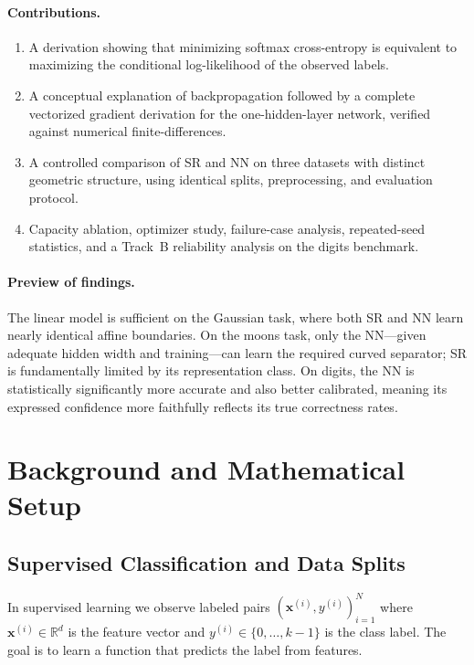 \documentclass[11pt]{article}
\newcommand{\R}{\mathbb{R}}
\newcommand{\vx}{\mathbf{x}}
\begin{document}
\paragraph{Contributions.}
\begin{enumerate}[leftmargin=*, itemsep=0.2em]
    \item A derivation showing that minimizing softmax cross-entropy is equivalent to
          maximizing the conditional log-likelihood of the observed labels.
    \item A conceptual explanation of backpropagation followed by a complete vectorized
          gradient derivation for the one-hidden-layer network, verified against
          numerical finite-differences.
    \item A controlled comparison of SR and NN on three datasets with distinct geometric
          structure, using identical splits, preprocessing, and evaluation protocol.
    \item Capacity ablation, optimizer study, failure-case analysis, repeated-seed
          statistics, and a Track~B reliability analysis on the digits benchmark.
\end{enumerate}

\paragraph{Preview of findings.}
The linear model is sufficient on the Gaussian task, where both SR and NN learn
nearly identical affine boundaries.
On the moons task, only the NN---given adequate hidden width and training---can learn the
required curved separator; SR is fundamentally limited by its representation class.
On digits, the NN is statistically significantly more accurate and also better calibrated,
meaning its expressed confidence more faithfully reflects its true correctness rates.


\section{Background and Mathematical Setup}

\subsection{Supervised Classification and Data Splits}

In supervised learning we observe labeled pairs $(\vx^{(i)}, y^{(i)})_{i=1}^N$ where
$\vx^{(i)} \in \R^d$ is the feature vector and $y^{(i)} \in \{0, \ldots, k{-}1\}$ is
the class label.
The goal is to learn a function that predicts the label from features.
\end{document}
